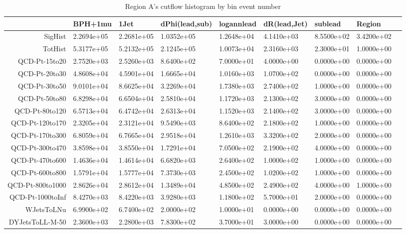 \begin{landscape}
\begin{table}[htb]
\caption{Region A's cutflow histogram by bin event number}
\begin{tabular}{rllllllll}

 \hline 
&BPH+1mu & 1Jet & dPhi(lead,sub) & logannlead & dR(lead,Jet) & sublead & Region \\
 \hline 
 \hline 
SigHist&2.2694e+05&2.2681e+05&1.0352e+05&1.2648e+04&4.1410e+03&8.5500e+02&3.4200e+02\\
 \hline 
TotHist&5.3177e+05&5.2132e+05&2.1245e+05&1.0073e+04&2.3160e+03&2.3000e+01&1.0000e+00\\
 \hline 
QCD-Pt-15to20&2.7520e+03&2.5260e+03&8.6400e+02&7.0000e+01&4.0000e+00&0.0000e+00&0.0000e+00\\
 \hline 
QCD-Pt-20to30&4.8608e+04&4.5901e+04&1.6665e+04&1.0160e+03&1.0700e+02&0.0000e+00&0.0000e+00\\
 \hline 
QCD-Pt-30to50&9.0101e+04&8.6625e+04&3.2269e+04&1.7380e+03&2.7400e+02&1.0000e+00&0.0000e+00\\
 \hline 
QCD-Pt-50to80&6.8298e+04&6.6504e+04&2.5810e+04&1.1720e+03&2.1300e+02&3.0000e+00&0.0000e+00\\
 \hline 
QCD-Pt-80to120&6.5713e+04&6.4742e+04&2.6313e+04&1.1520e+03&2.1400e+02&3.0000e+00&0.0000e+00\\
 \hline 
QCD-Pt-120to170&2.3205e+04&2.3121e+04&9.5490e+03&8.6400e+02&2.1800e+02&1.0000e+00&0.0000e+00\\
 \hline 
QCD-Pt-170to300&6.8059e+04&6.7665e+04&2.9518e+04&1.2610e+03&3.3200e+02&2.0000e+00&0.0000e+00\\
 \hline 
QCD-Pt-300to470&3.8598e+04&3.8550e+04&1.7291e+04&7.0500e+02&2.1900e+02&4.0000e+00&0.0000e+00\\
 \hline 
QCD-Pt-470to600&1.4636e+04&1.4614e+04&6.6820e+03&2.6400e+02&1.0000e+02&1.0000e+00&0.0000e+00\\
 \hline 
QCD-Pt-600to800&1.5791e+04&1.5777e+04&7.3730e+03&2.4500e+02&1.0200e+02&1.0000e+00&0.0000e+00\\
 \hline 
QCD-Pt-800to1000&2.8626e+04&2.8612e+04&1.3489e+04&4.8500e+02&2.4900e+02&4.0000e+00&1.0000e+00\\
 \hline 
QCD-Pt-1000toInf&8.4270e+03&8.4220e+03&3.9280e+03&1.1800e+02&5.7000e+01&2.0000e+00&0.0000e+00\\
 \hline 
WJetsToLNu&6.9900e+02&6.7400e+02&2.0000e+02&1.0000e+01&0.0000e+00&0.0000e+00&0.0000e+00\\
 \hline 
DYJetsToLL-M-50&2.3600e+03&2.2800e+03&7.8300e+02&3.7000e+01&3.0000e+00&0.0000e+00&0.0000e+00\\

\end{tabular}
\end{table}
\end{landscape}
